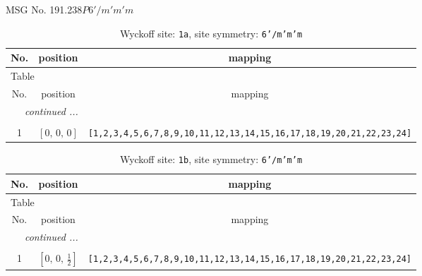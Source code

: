 \documentclass[fleqn,8pt]{jsarticle}
\begin{document}
\setcounter{MaxMatrixCols}{32}

\renewcommand{\tablename}{Table~}
\renewcommand{\figurename}{Figure~}
\begin{center}
\LARGE
MSG No. 191.238\quad$P6'/m'm'm$
\end{center}
\renewcommand{\arraystretch}{1.2}
\begin{longtable}{ccc}
\caption{Wyckoff site: {\tt 1a}, site symmetry: {\tt 6'/m'm'm}}
 \\
 \hline \hline
No. & position & mapping \\ \hline \endfirsthead

\multicolumn{2}{l}{\tablename\ \thetable{}} \\
 \hline \hline
No. & position & mapping \\ \hline \endhead

 \hline \hline
\multicolumn{2}{r}{\footnotesize\it continued ...} \\ \endfoot

 \hline \hline
\multicolumn{2}{r}{} \\ \endlastfoot

1 & $\left[ 0,\, 0,\, 0 \right]$ & {\tt [1,2,3,4,5,6,7,8,9,10,11,12,13,14,15,16,17,18,19,20,21,22,23,24]} \\
\end{longtable}
\renewcommand{\arraystretch}{1.2}
\begin{longtable}{ccc}
\caption{Wyckoff site: {\tt 1b}, site symmetry: {\tt 6'/m'm'm}}
 \\
 \hline \hline
No. & position & mapping \\ \hline \endfirsthead

\multicolumn{2}{l}{\tablename\ \thetable{}} \\
 \hline \hline
No. & position & mapping \\ \hline \endhead

 \hline \hline
\multicolumn{2}{r}{\footnotesize\it continued ...} \\ \endfoot

 \hline \hline
\multicolumn{2}{r}{} \\ \endlastfoot

1 & $\left[ 0,\, 0,\, \frac{1}{2} \right]$ & {\tt [1,2,3,4,5,6,7,8,9,10,11,12,13,14,15,16,17,18,19,20,21,22,23,24]} \\
\end{longtable}
\renewcommand{\arraystretch}{1.2}
\end{document}
